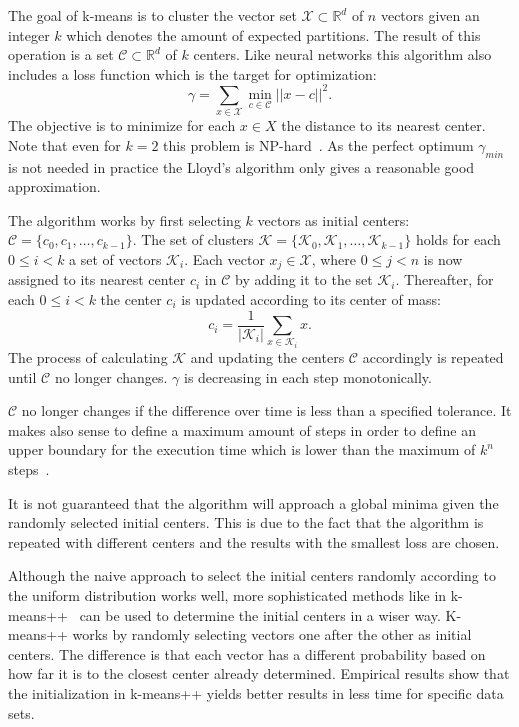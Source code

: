 The goal of k-means is to cluster the vector set $\mathcal{X} \subset \mathbb{R}^d$ of $n$ vectors given an integer $k$ which denotes the amount of expected partitions. The result of this operation is a set $\mathcal{C} \subset \mathbb{R}^d$ of $k$ centers. Like neural networks this algorithm also includes a loss function which is the target for optimization:
\begin{equation}
	\gamma=\sum_{x \in \mathcal{X}} \min_{c \in \mathcal{C}} ||x-c||^2. %
	\label{eq.k-means-objective}
\end{equation}
The objective is to minimize for each $x \in X$ the distance to its nearest center.
Note that even for $k=2$ this problem is NP-hard~\cite{Aloise2009}. As the perfect optimum $\gamma_{min}$ is not needed in practice the Lloyd's algorithm only gives a reasonable good approximation.~\cite{Arthur2007}

The algorithm works by first selecting $k$ vectors as initial centers: $\mathcal{C}=\{c_0, c_1, \ldots, c_{k-1}\}$. The set of clusters $\mathcal{K}=\{\mathcal{K}_0, \mathcal{K}_1, \ldots, \mathcal{K}_{k-1}\}$ holds for each $0 \le i < k$ a set of vectors $\mathcal{K}_i$. Each vector $x_j \in \mathcal{X}$, where $0 \le j < n$ is now assigned to its nearest center $c_i$ in $\mathcal{C}$ by adding it to the set $\mathcal{K}_i$. Thereafter, for each $0 \le i < k$ the center $c_i$ is updated according to its center of mass:
\begin{equation}
	c_i = \frac{1}{|\mathcal{K}_i|} \sum_{x \in \mathcal{K}_i} x.
\end{equation}
The process of calculating $\mathcal{K}$ and updating the centers $\mathcal{C}$ accordingly is repeated until $\mathcal{C}$ no longer changes. $\gamma$ is decreasing in each step monotonically.~\cite[p.~2]{Arthur2007}

$\mathcal{C}$ no longer changes if the difference over time is less than a specified tolerance. It makes also sense to define a maximum amount of steps in order to define an upper boundary for the execution time which is lower than the maximum of $k^n$ steps~\cite[p.~2]{Arthur2007}.

It is not guaranteed that the algorithm will approach a global minima given the randomly selected initial centers. This is due to the fact that the algorithm is repeated with different centers and the results with the smallest loss are chosen.

Although the naive approach to select the initial centers randomly according to the uniform distribution works well, more sophisticated methods like in k-means++~\cite{Arthur2007} can be used to determine the initial centers in a wiser way. K-means++ works by randomly selecting vectors one after the other as initial centers. The difference is that each vector has a different probability based on how far it is to the closest center already determined.
Empirical results show that the initialization in k-means++ yields better results in less time for specific data sets.

